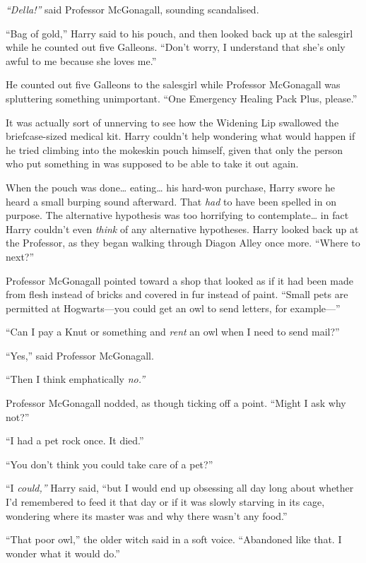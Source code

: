 \emph{``Della!''} said Professor McGonagall, sounding scandalised.

``Bag of gold,'' Harry said to his pouch, and then looked back up at the
salesgirl while he counted out five Galleons. ``Don't worry, I
understand that she's only awful to me because she loves me.''

He counted out five Galleons to the salesgirl while Professor McGonagall
was spluttering something unimportant. ``One Emergency Healing Pack
Plus, please.''

It was actually sort of unnerving to see how the Widening Lip swallowed
the briefcase-sized medical kit. Harry couldn't help wondering what
would happen if he tried climbing into the mokeskin pouch himself, given
that only the person who put something in was supposed to be able to
take it out again.

When the pouch was done\ldots{} eating\ldots{} his hard-won purchase,
Harry swore he heard a small burping sound afterward. That \emph{had} to
have been spelled in on purpose. The alternative hypothesis was too
horrifying to contemplate\ldots{} in fact Harry couldn't even
\emph{think} of any alternative hypotheses. Harry looked back up at the
Professor, as they began walking through Diagon Alley once more. ``Where
to next?''

Professor McGonagall pointed toward a shop that looked as if it had been
made from flesh instead of bricks and covered in fur instead of paint.
``Small pets are permitted at Hogwarts---you could get an owl to send
letters, for example---''

``Can I pay a Knut or something and \emph{rent} an owl when I need to
send mail?''

``Yes,'' said Professor McGonagall.

``Then I think emphatically \emph{no.''}

Professor McGonagall nodded, as though ticking off a point. ``Might I
ask why not?''

``I had a pet rock once. It died.''

``You don't think you could take care of a pet?''

``I \emph{could,''} Harry said, ``but I would end up obsessing all day
long about whether I'd remembered to feed it that day or if it was
slowly starving in its cage, wondering where its master was and why
there wasn't any food.''

``That poor owl,'' the older witch said in a soft voice. ``Abandoned
like that. I wonder what it would do.''

